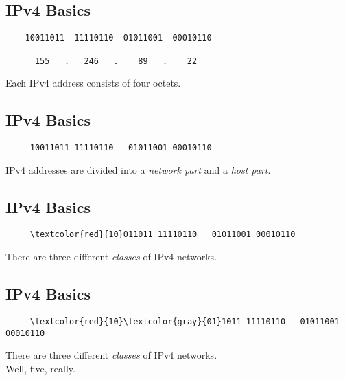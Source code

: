 \documentclass[xga]{xdvislides}
\begin{document}
\subsection{IPv4 Basics}
\vspace{.5in}
\Hugesize
\begin{center}
\begin{verbatim}
    10011011  11110110  01011001  00010110

      155   .   246   .    89   .    22
\end{verbatim}
\vspace{.5in}
Each IPv4 address consists of four octets.
\end{center}
\Normalsize


\subsection{IPv4 Basics}
\vspace{.5in}
\Hugesize
\begin{center}
\begin{verbatim}
     10011011 11110110   01011001 00010110
\end{verbatim}
\vspace{.5in}
IPv4 addresses are divided into a {\em network part} and a {\em host part}.
\end{center}
\Normalsize

\subsection{IPv4 Basics}
\vspace{.5in}
\Hugesize
\begin{center}
\begin{Verbatim}
     \textcolor{red}{10}011011 11110110   01011001 00010110
\end{Verbatim}
\vspace{.5in}
There are three different {\em classes} of IPv4 networks.
\end{center}
\Normalsize

\subsection{IPv4 Basics}
\vspace{.5in}
\Hugesize
\begin{center}
\begin{Verbatim}
     \textcolor{red}{10}\textcolor{gray}{01}1011 11110110   01011001 00010110
\end{Verbatim}
\vspace{.5in}
There are three different {\em classes} of IPv4 networks. \\
Well, five, really.
\end{center}
\Normalsize
\end{document}
